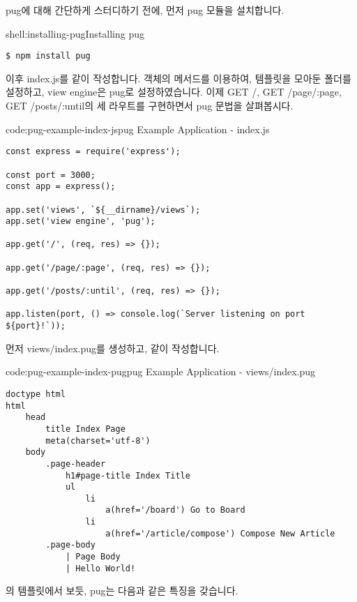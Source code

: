 pug에 대해 간단하게 스터디하기 전에, 먼저 pug 모듈을 설치합니다.

\begin{shellenv}{shell:installing-pug}{Installing pug}\begin{verbatim}
$ npm install pug
\end{verbatim}
\end{shellenv}

이후 index.js를 \와 같이 작성합니다.  객체의  메서드를 이용하여, 템플릿을 모아둔 폴더를 설정하고, view engine은 pug로 설정하였습니다. 이제 GET /, GET /page/:page, GET /posts/:until의 세 라우트를 구현하면서 pug 문법을 살펴봅시다.

\begin{codeenv}{code:pug-example-index-js}{pug Example Application - index.js}\begin{verbatim}
const express = require('express');

const port = 3000;
const app = express();

app.set('views', `${__dirname}/views`);
app.set('view engine', 'pug');

app.get('/', (req, res) => {});

app.get('/page/:page', (req, res) => {});

app.get('/posts/:until', (req, res) => {});

app.listen(port, () => console.log(`Server listening on port ${port}!`));
\end{verbatim}
\end{codeenv}

먼저 views/index.pug를 생성하고, \와 같이 작성합니다.

\begin{codeenv}{code:pug-example-index-pug}{pug Example Application - views/index.pug}\begin{verbatim}
doctype html
html
    head
        title Index Page
        meta(charset='utf-8')
    body
        .page-header
            h1#page-title Index Title
            ul
                li
                    a(href='/board') Go to Board
                li
                    a(href='/article/compose') Compose New Article
        .page-body
            | Page Body
            | Hello World!
\end{verbatim}
\end{codeenv}

의 템플릿에서 보듯, pug는 다음과 같은 특징을 갖습니다.

